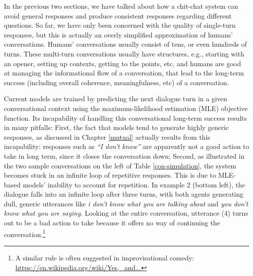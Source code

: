 In the previous two sections, 
we have talked about how a chit-chat system can avoid general responses and produce consistent responses regarding different questions. 
So far, we have only been concerned with the quality of single-turn responses, but this is actually an overly simplified approximation  
of humans' conversations.
Humans' conversations usually consist of tens, or even hundreds of turns.
These multi-turn conversations usually 
 have structures, e.g., starting with an opener, setting up contexts, 
getting to the points, etc, and humans are good at managing the informational flow of a conversation, that lead to the long-term success (including overall coherence, meaningfulness, etc) of a conversation.

Current models are trained by predicting the next dialogue turn in a given conversational context using the maximum-likelihood estimation (MLE) objective function. 
Its incapability of handling this conversational long-term success results in many pitfalls:
First, 
the fact that \sts models tend to generate highly generic responses, as discussed in Chapter \ref{mutual} actually results from this incapability: responses such as {\it ``I don't know''} are apparently not a good action to take in long term, since it closes the conversation down; 
Second, as illustrated in the two sample conversations on the  left of Table \ref{con-simulation},  the system becomes stuck in an infinite loop of repetitive responses. This is due to MLE-based \sts models' inability to account for repetition.
In example 2 (bottom left), the dialogue falls into an infinite loop after three turns, with both agents generating dull, generic utterances like {\it i don't know what you are talking about} and {\it you don't know what you are saying}. 
Looking at the entire conversation, utterance (4) turns out to be a bad action to take
because it offers no way of continuing the conversation.\footnote{A similar rule is often suggested in improvisational comedy: \url{https://en.wikipedia.org/wiki/Yes,_and...}}
